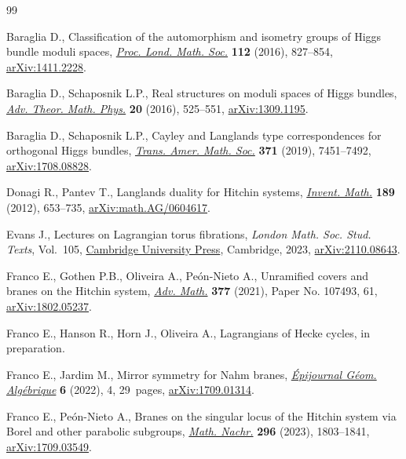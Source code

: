 \documentclass[10pt,a4paper]{amsart}
\numberwithin{equation}{section}
\theoremstyle{definition}
\begin{document}
\begin{thebibliography}{99}
\footnotesize\itemsep=0pt

Baraglia D., Classification of the automorphism and isometry groups of {H}iggs
 bundle moduli spaces,
 \href{https://doi.org/10.1112/plms/pdw014}{\textit{Proc. Lond. Math. Soc.}}
 \textbf{112} (2016), 827--854,
 \href{http://arxiv.org/abs/1411.2228}{arXiv:1411.2228}.

Baraglia D., Schaposnik L.P., Real structures on moduli spaces of {H}iggs
 bundles, \href{https://doi.org/10.4310/ATMP.2016.v20.n3.a2}{\textit{Adv.
 Theor. Math. Phys.}} \textbf{20} (2016), 525--551,
 \href{http://arxiv.org/abs/1309.1195}{arXiv:1309.1195}.

Baraglia D., Schaposnik L.P., Cayley and {L}anglands type correspondences for
 orthogonal {H}iggs bundles,
 \href{https://doi.org/10.1090/tran/7587}{\textit{Trans. Amer. Math. Soc.}}
 \textbf{371} (2019), 7451--7492,
 \href{http://arxiv.org/abs/1708.08828}{arXiv:1708.08828}.

Donagi R., Pantev T., Langlands duality for {H}itchin systems,
 \href{https://doi.org/10.1007/s00222-012-0373-8}{\textit{Invent. Math.}}
 \textbf{189} (2012), 653--735,
 \href{http://arxiv.org/abs/math.AG/0604617}{arXiv:math.AG/0604617}.

Evans J., Lectures on {L}agrangian torus fibrations, \textit{London Math. Soc.
 Stud. Texts}, Vol.~105,
 \href{https://doi.org/10.1017/9781009372671}{Cambridge University Press},
 Cambridge, 2023, \href{http://arxiv.org/abs/2110.08643}{arXiv:2110.08643}.

Franco E., Gothen P.B., Oliveira A., Pe\'{o}n-Nieto A., Unramified covers and
 branes on the {H}itchin system,
 \href{https://doi.org/10.1016/j.aim.2020.107493}{\textit{Adv. Math.}}
 \textbf{377} (2021), Paper No. 107493, 61,
 \href{http://arxiv.org/abs/1802.05237}{arXiv:1802.05237}.

Franco E., Hanson R., Horn J., Oliveira A., Lagrangians of Hecke cycles, {i}n
 preparation.

Franco E., Jardim M., Mirror symmetry for {N}ahm branes,
 \href{https://doi.org/10.46298/epiga.2022.6604}{\textit{\'{E}pijournal
 G\'{e}om. Alg\'{e}brique}} \textbf{6} (2022), 4, 29~pages,
 \href{http://arxiv.org/abs/1709.01314}{arXiv:1709.01314}.

Franco E., Pe\'{o}n-Nieto A., Branes on the singular locus of the {H}itchin
 system via {B}orel and other parabolic subgroups,
 \href{https://doi.org/10.1002/mana.202000267}{\textit{Math. Nachr.}}
 \textbf{296} (2023), 1803--1841,
 \href{http://arxiv.org/abs/1709.03549}{arXiv:1709.03549}.


\end{thebibliography}
\end{document}
